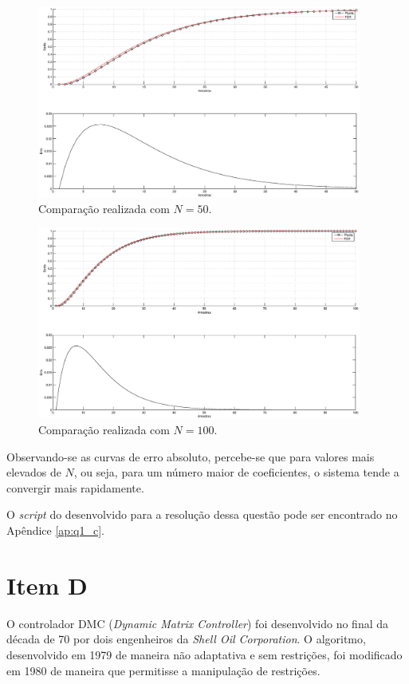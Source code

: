 \begin{figure}[htb]
\centering
    \includegraphics[width=0.95\textwidth]{imgs/questao1/item_c_N_50}
    \caption{Comparação realizada com $N = 50$.}
    \label{fig:item_c_50}
\end{figure}

\begin{figure}[H]
\centering
    \includegraphics[width=0.95\textwidth]{imgs/questao1/item_c_N_100}
    \caption{Comparação realizada com $N = 100$.}
    \label{fig:item_c_100}
\end{figure}

Observando-se as curvas de erro absoluto, percebe-se que para valores mais
elevados de $N$, ou seja, para um número maior de coeficientes, o sistema
tende a convergir mais rapidamente.

O {\it script} do \Matlab desenvolvido para a resolução dessa questão pode
ser encontrado no Apêndice \ref{ap:q1_c}.

\section*{Item D}
O controlador DMC ({\it Dynamic Matrix Controller}) foi desenvolvido no final da
década de 70 por dois engenheiros da {\it Shell Oil Corporation}. O algoritmo,
desenvolvido em 1979 de maneira não adaptativa e sem restrições, foi modificado
em 1980 de maneira que permitisse a manipulação de restrições.

